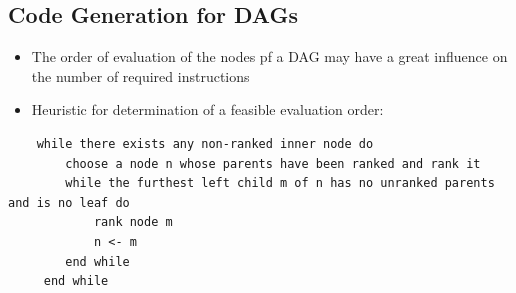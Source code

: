\subsection{Code Generation for DAGs}
\begin{itemize}
	\item The order of evaluation of the nodes pf a DAG may have a great influence on the number of required instructions
	\item Heuristic for determination of a feasible evaluation order:
\end{itemize}
\begin{verbatim}
	while there exists any non-ranked inner node do
	    choose a node n whose parents have been ranked and rank it
	    while the furthest left child m of n has no unranked parents and is no leaf do
	        rank node m
	        n <- m
	    end while
	 end while   
\end{verbatim}  



 









